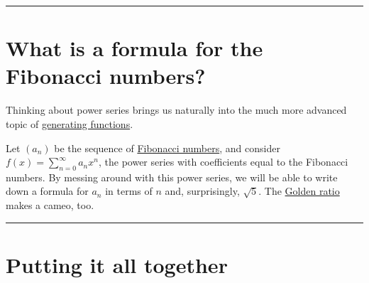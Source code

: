 \documentclass{ximera}
\begin{document}
\hrule

\section{What is a formula for the Fibonacci numbers?}

Thinking about power series brings us naturally into the much more advanced topic of \href{http://en.wikipedia.org/wiki/Generating_function}{generating functions}.

Let \((a_n)\) be the sequence of \href{http://en.wikipedia.org/wiki/Fibonacci_number}{Fibonacci numbers}, and consider \(f(x) = \sum_{n=0}^\infty a_n x^n\), the power series with coefficients equal to the Fibonacci numbers.  By messing around with this power series, we will be able to write down a formula for \(a_n\) in terms of \(n\) and, surprisingly, \(\sqrt{5}\).  The \href{http://en.wikipedia.org/wiki/Golden_ratio}{Golden ratio} makes a cameo, too.



\hrule

\section{Putting it all together}
\end{document}

